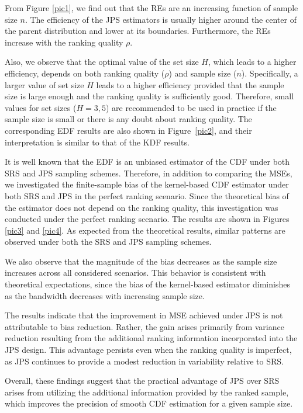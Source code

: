 \documentclass[twoside]{article}
\begin{document}
From Figure \ref{pic1}, we find out that the REs are an increasing function of sample size $n$. The efficiency of the JPS estimators is usually higher around the center of the parent distribution and lower at its boundaries. Furthermore, the REs increase with the ranking quality $\rho$. 

Also, we observe that the optimal value of  the set size $H$, which leads to a higher efficiency,  depends on both ranking quality ($\rho$) and sample size ($n$). Specifically, a larger value of set size $H$ leads to a higher efficiency provided that the sample size is  large enough  and the ranking quality is sufficiently good. Therefore, small values for set sizes ($H=3, 5$) are recommended to be used in practice if the sample size is small or there is any doubt about ranking quality. 
The corresponding EDF results are also shown in Figure~\ref{pic2}, and their interpretation is similar to that of the KDF results.


It is well known that the EDF is an unbiased estimator of the CDF under both SRS and JPS sampling schemes.
 Therefore, in addition to comparing the MSEs, we investigated the finite-sample bias of the kernel-based CDF estimator under both SRS and JPS in the perfect ranking scenario. Since the theoretical bias of the estimator does not depend on the ranking quality, this investigation was conducted under the perfect ranking scenario.
 The results are shown in Figures   \ref{pic3} and \ref{pic4}. As expected from the theoretical results, similar patterns are observed under both the SRS and JPS sampling schemes.

We also observe that the magnitude of the bias decreases as the sample size increases across all considered scenarios. This behavior is consistent with theoretical expectations, since the bias of the kernel-based estimator diminishes as the bandwidth decreases with increasing sample size.

 The results indicate that the improvement in MSE achieved under JPS is not attributable to bias reduction. Rather, the gain arises primarily from variance reduction resulting from the additional ranking information incorporated into the JPS design. This advantage persists even when the ranking quality is imperfect, as JPS continues to provide a modest reduction in variability relative to SRS.
 
{\color{blue} Overall, these findings suggest that the practical advantage of JPS over SRS arises from utilizing the additional information provided by the ranked sample, which improves the precision of smooth CDF estimation for a given sample size.
}
\end{document}
